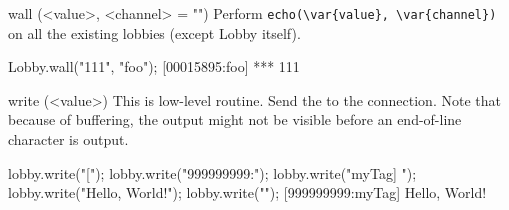 \begin{urbiscriptapi}
\item[wall](<value>, <channel> = "")%
  Perform \lstinline|echo(\var{value}, \var{channel})| on all the
  existing lobbies (except Lobby itself).
\begin{urbiscript}[firstnumber=1]
Lobby.wall("111", "foo");
[00015895:foo] *** 111
\end{urbiscript}


\item[write](<value>)%
  This is low-level routine.  Send the  
  to the connection.  Note that because of buffering, the output might
  not be visible before an end-of-line character is output.
\begin{urbiscript}
lobby.write("[");
lobby.write("999999999:");
lobby.write("myTag] ");
lobby.write("Hello, World!");
lobby.write("\n");
[999999999:myTag] Hello, World!
\end{urbiscript}
\end{urbiscriptapi}

